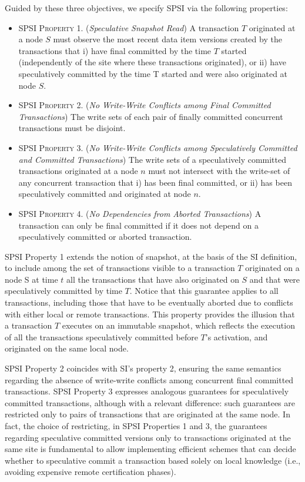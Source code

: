 Guided by these three objectives, we specify SPSI via the following properties:
\begin{itemize}
\item \textsc{SPSI Property 1.} (\textit{Speculative Snapshot Read}) A transaction $T$ originated at a node $S$ must observe the most recent data item versions created by the transactions that i) have final committed by the time $T$ started (independently of the site where these transactions originated), or ii) have speculatively committed by the time T started and were also originated at node $S$.
\item \textsc{SPSI Property 2.} (\textit{No Write-Write Conflicts among Final Committed Transactions}) The write sets of
each pair of finally committed concurrent transactions must be disjoint.
\item \textsc{SPSI Property 3.} (\textit{No Write-Write Conflicts among Speculatively Committed and Committed Transactions}) The write sets of a speculatively committed transactions originated at a node $n$ must not intersect with the write-set of any concurrent transaction that i) has been final committed, or ii) has been speculatively committed and originated at node $n$.
\item \textsc{SPSI Property 4.} (\textit{No Dependencies from Aborted Transactions}) A transaction can only be final committed if it does not depend on a speculatively committed or aborted transaction.
\end{itemize}

SPSI Property 1 extends the notion of snapshot, at the basis of the SI definition, to include among the set of  transactions visible to a transaction $T$ originated on a node S at time $t$ all the transactions that have also originated on $S$ and that were speculatively committed by time $T$. Notice that this guarantee applies to all transactions, including those that have to be eventually aborted due to conflicts with either local or remote transactions. This property provides the illusion that a transaction $T$ executes on an immutable snapshot, which reflects the execution of all the transactions speculatively committed before $T$'s activation, and originated on the same local node. 

SPSI Property 2 coincides with SI's property 2, ensuring the same semantics regarding the absence of write-write conflicts among concurrent final committed transactions. SPSI Property 3 expresses analogous guarantees for speculatively committed transactions, although with a relevant difference: such guarantees are restricted only to pairs of transactions that are originated at the same node. In fact, the choice of restricting, in SPSI Properties 1 and 3, the guarantees regarding speculative committed versions only to transactions originated at the same site is fundamental to allow implementing efficient schemes that can decide whether to speculative commit a transaction based solely on local knowledge (i.e., avoiding expensive remote certification phases).

